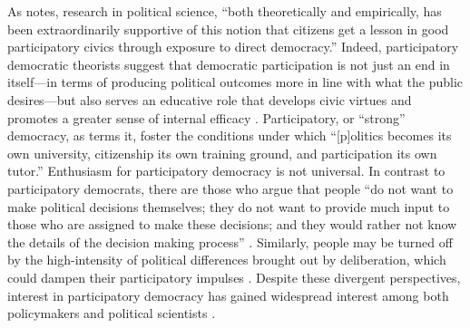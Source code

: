 \documentclass[12pt, letter]{article}
\begin{document}
As \textcite[540]{dyck2009initiated} notes, research in political science, ``both theoretically and empirically, has been extraordinarily supportive of this notion that citizens get a lesson in good participatory civics through exposure to direct democracy.'' Indeed, participatory democratic theorists suggest that democratic participation is not just an end in itself---in terms of producing political outcomes more in line with what the public desires---but also serves an educative role that develops civic virtues and promotes a greater sense of internal efficacy \parencite{pateman1970participation}. Participatory, or ``strong'' democracy, as \textcite[152]{barber2003strong} terms it, foster the conditions under which ``[p]olitics becomes its own university, citizenship its own training ground, and participation its own tutor.'' Enthusiasm for participatory democracy is not universal. In contrast to participatory democrats, there are those who argue that people ``do not want to make political decisions themselves; they do not want to provide much input to those who are assigned to make these decisions; and they would rather not know the details of the decision making process'' \parencite{hibbing2002stealth}. Similarly, people may be turned off by the high-intensity of political differences brought out by deliberation, which could dampen their participatory impulses \parencite{mutz2006hearing}. Despite these divergent perspectives, interest in participatory democracy has gained widespread interest among both policymakers and political scientists \parencite{webb2013willing}. 
\end{document}
